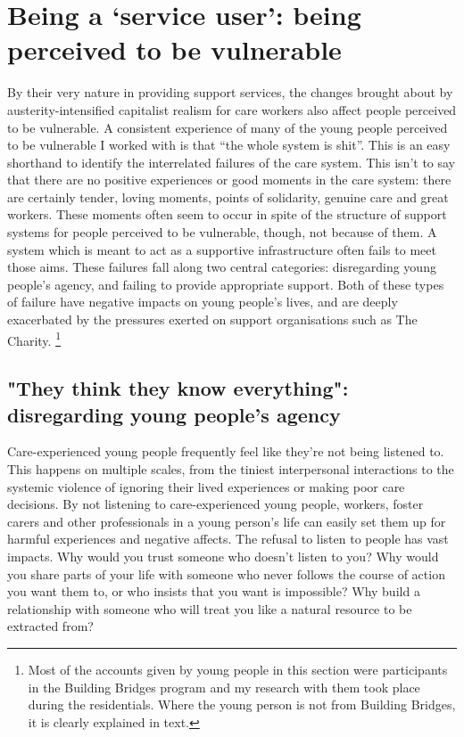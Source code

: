 \section{Being a ‘service user’: being perceived to be vulnerable}

By their very nature in providing support services, the changes brought about by austerity-intensified capitalist realism for care workers also affect people perceived to be vulnerable. A consistent experience of many of the young people perceived to be vulnerable I worked with is that “the whole system is shit”. This is an easy shorthand to identify the interrelated failures of the care system. This isn’t to say that there are no positive experiences or good moments in the care system: there are certainly tender, loving moments, points of solidarity, genuine care and great workers. These moments often seem to occur in spite of the structure of support systems for people perceived to be vulnerable, though, not because of them. A system which is meant to act as a supportive infrastructure often fails to meet those aims. These failures fall along two central categories: disregarding young people's agency, and failing to provide appropriate support. Both of these types of failure have negative impacts on young people's lives, and are deeply exacerbated by the pressures exerted on support organisations such as The Charity. 
\footnote{Most of the accounts given by young people in this section were participants in the Building Bridges program and my research with them took place during the residentials. Where the young person is not from Building Bridges, it is clearly explained in text.}

\subsection{"They think they know everything": disregarding young people's agency}
Care-experienced young people frequently feel like they're not being listened to. This happens on multiple scales, from the tiniest interpersonal interactions to the systemic violence of ignoring their lived experiences or making poor care decisions. By not listening to care-experienced young people, workers, foster carers and other professionals in a young person's life can easily set them up for harmful experiences and negative affects. The refusal to listen to people has vast impacts. Why would you trust someone who doesn't listen to you? Why would you share parts of your life with someone who never follows the course of action you want them to, or who insists that you want is impossible? Why build a relationship with someone who will treat you like a natural resource to be extracted from?

